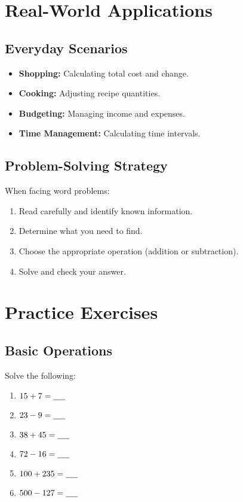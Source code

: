 \section{Real-World Applications}
\subsection{Everyday Scenarios}
\begin{itemize}
    \item \textbf{Shopping:} Calculating total cost and change.
    \item \textbf{Cooking:} Adjusting recipe quantities.
    \item \textbf{Budgeting:} Managing income and expenses.
    \item \textbf{Time Management:} Calculating time intervals.
\end{itemize}

\subsection{Problem-Solving Strategy}
When facing word problems:
\begin{enumerate}
    \item Read carefully and identify known information.
    \item Determine what you need to find.
    \item Choose the appropriate operation (addition or subtraction).
    \item Solve and check your answer.
\end{enumerate}

\section{Practice Exercises}
\subsection{Basic Operations}
Solve the following:
\begin{multicols}{2}
\begin{enumerate}[label=\alph*)]
    \item $15 + 7 = \underline{\hspace{0.5cm}}$
    \item $23 - 9 = \underline{\hspace{0.5cm}}$
    \item $38 + 45 = \underline{\hspace{0.5cm}}$
    \item $72 - 16 = \underline{\hspace{0.5cm}}$
    \item $100 + 235 = \underline{\hspace{0.5cm}}$
    \item $500 - 127 = \underline{\hspace{0.5cm}}$
\end{enumerate}
\end{multicols}

